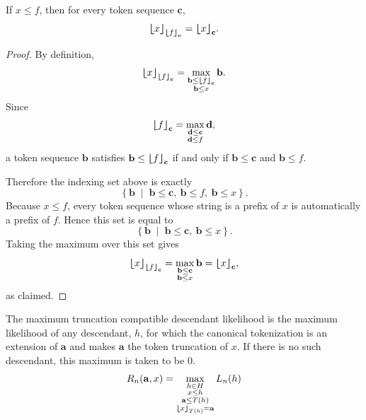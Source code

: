 \begin{lemma}
    \label{lemma:token-truncation-string-prefix-transitivity}
    If $x \leq f$, then for every token sequence $\mathbf{c}$,
    $$
    {\bm{\lfloor}} x {\bm{\rfloor}}_{{\bm{\lfloor}} f {\bm{\rfloor}}_{\mathbf{c}}} = {\bm{\lfloor}} x {\bm{\rfloor}}_{\mathbf{c}}.
    $$
\end{lemma}
\begin{proof}
    By definition,
    $$
    {\bm{\lfloor}} x {\bm{\rfloor}}_{{\bm{\lfloor}} f {\bm{\rfloor}}_{\mathbf{c}}}
    =
    \max_{\substack{
        \mathbf{b} \leq {\bm{\lfloor}} f {\bm{\rfloor}}_{\mathbf{c}} \\
        \mathbf{b} \leq x
    }}
    \mathbf{b}.
    $$
    Since
    $$
    {\bm{\lfloor}} f {\bm{\rfloor}}_{\mathbf{c}}
    =
    \max_{\substack{
        \mathbf{d} \leq \mathbf{c} \\
        \mathbf{d} \leq f
    }}
    \mathbf{d},
    $$
    a token sequence $\mathbf{b}$ satisfies $\mathbf{b} \leq {\bm{\lfloor}} f {\bm{\rfloor}}_{\mathbf{c}}$ if and only if
    $\mathbf{b} \leq \mathbf{c}$ and $\mathbf{b} \leq f$.

    Therefore the indexing set above is exactly
    $$
    \left\{
        \mathbf{b} \;\middle|\; \mathbf{b} \leq \mathbf{c},\ \mathbf{b} \leq f,\ \mathbf{b} \leq x
    \right\}.
    $$
    Because $x \leq f$, every token sequence whose string is a prefix of $x$ is automatically a prefix of $f$.
    Hence this set is equal to
    $$
    \left\{
        \mathbf{b} \;\middle|\; \mathbf{b} \leq \mathbf{c},\ \mathbf{b} \leq x
    \right\}.
    $$
    Taking the maximum over this set gives
    $$
    {\bm{\lfloor}} x {\bm{\rfloor}}_{{\bm{\lfloor}} f {\bm{\rfloor}}_{\mathbf{c}}}
    =
    \max_{\substack{
        \mathbf{b} \leq \mathbf{c} \\
        \mathbf{b} \leq x
    }}
    \mathbf{b}
    =
    {\bm{\lfloor}} x {\bm{\rfloor}}_{\mathbf{c}},
    $$
    as claimed.
\end{proof}

\begin{definition}
\label{def:maximum-truncation-compatible-descendant-likelihood}
    The maximum truncation compatible descendant likelihood is the maximum likelihood of any descendant, $h$, 
    for which the canonical tokenization is an extension of $\mathbf{a}$ and makes $\mathbf{a}$ the
    token truncation of $x$. If there is no such descendant, this maximum is taken to be $0$.
    $$
    R_n(\mathbf{a}, x) =
    \max_{\substack{
        h \in H \\
        x \leq h \\
        \mathbf{a} \leq T(h) \\
        {\bm{\lfloor}} x {\bm{\rfloor}}_{T(h)} = \mathbf{a}
    }}
    L_n(h)
    $$
\end{definition}

